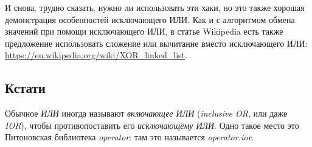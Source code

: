 И снова, трудно сказать, нужно ли использовать эти хаки, но это также хорошая демонстрация особенностей исключающего ИЛИ.
Как и с алгоритмом обмена значений при помощи исключающего ИЛИ, в статье Wikipedia есть также предложение использовать
сложение или вычитание вместо исключающего ИЛИ:
\url{https://en.wikipedia.org/wiki/XOR_linked_list}.




\subsection{Кстати}

Обычное \emph{ИЛИ} иногда называют \emph{включающее ИЛИ} (\emph{inclusive OR}, или даже \emph{IOR}),
чтобы противопоставить его \emph{исключающему ИЛИ}.
Одно такое место это Питоновская библиотека \emph{operator}: там это называется \emph{operator.ior}.

